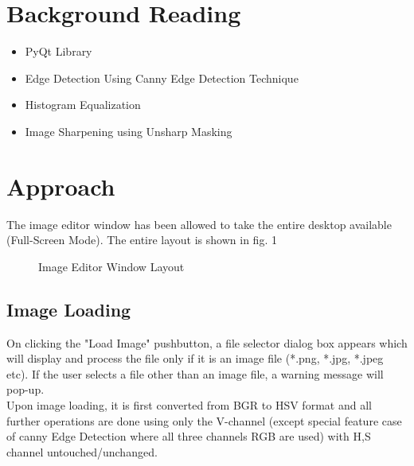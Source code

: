 \documentclass[letterpaper, 10 pt, conference]{ieeeconf}  %
\begin{document}
\section{\textbf{Background Reading}}
\begin{itemize}
\item PyQt Library
\item Edge Detection Using Canny Edge Detection Technique
\item Histogram Equalization
\item Image Sharpening using Unsharp Masking
\end{itemize}

\section{\textbf{Approach}}
The image editor window has been allowed to take the entire desktop available (Full-Screen Mode). The entire layout is shown in fig. 1
\begin{figure}[h!]%
	\centering
    \caption{Image Editor Window Layout}%
    \label{fig:image_editor_layout}%
\end{figure}

\subsection{\textbf{Image Loading}}
On clicking the "Load Image" pushbutton, a file selector dialog box appears which will display and process the file only if it is an image file (*.png, *.jpg, *.jpeg etc). If the user selects a file other than an image file, a warning message will pop-up. \\
Upon image loading, it is first converted from BGR to HSV format and all further operations are done using only the V-channel (except special feature case of canny Edge Detection where all three channels RGB are used) with H,S channel untouched/unchanged.
\end{document}
